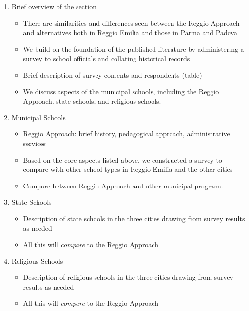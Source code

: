 \documentclass{article}
\begin{document}
\begin{enumerate}
\item Brief overview of the section
\begin{itemize}
	\item There are similarities and differences seen between the Reggio Approach and alternatives both in Reggio Emilia and those in Parma and Padova
	\item We build on the foundation of the published literature by administering a survey to school officials and collating historical records
	\item Brief description of survey contents and respondents (table)
	\item We discuss aspects of the municipal schools, including the Reggio Approach, state schools, and religious schools.
\end{itemize}
\item Municipal Schools
	\begin{itemize}
	\item Reggio Approach: brief history, pedagogical approach, administrative services
	\item Based on the core aspects listed above, we constructed a survey to compare with other school types in Reggio Emilia and the other cities
	\item Compare between Reggio Approach and other municipal programs
	\end{itemize}
\item State Schools
	\begin{itemize}
	\item Description of state schools in the three cities drawing from survey results as needed
	\item All this will \textit{compare} to the Reggio Approach
	\end{itemize}
\item Religious Schools
	\begin{itemize}
	\item Description of religious schools in the three cities drawing from survey results as needed
	\item All this will \textit{compare} to the Reggio Approach
	\end{itemize}
\end{enumerate}
\end{document}
